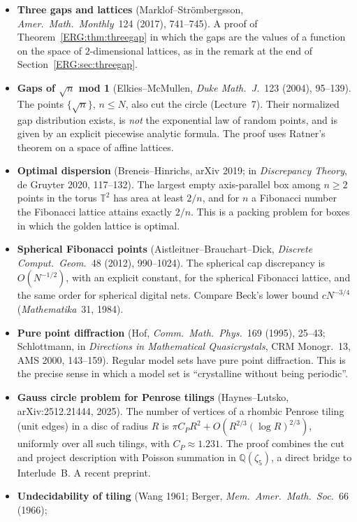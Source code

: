 \documentclass[11pt,openany]{book}
\theoremstyle{plain}
\theoremstyle{definition}
\theoremstyle{remark}
\newcommand{\Q}{\mathbb{Q}}
\newcommand{\T}{\mathbb{T}}
\begin{document}
\begin{itemize}[leftmargin=1.2em,itemsep=0.45em]
  Hausdorff dimension $0$. By the Dani correspondence, Littlewood concerns orbits of the $2$-parameter
  diagonal group on $X_3$.
\item \textbf{Three gaps and lattices} (Marklof--Str\"ombergsson, \emph{Amer.\ Math.\ Monthly}~124 (2017),
  741--745). A proof of Theorem~\ref{ERG:thm:threegap} in which the gaps are the values of a function on the
  space of $2$-dimensional lattices, as in the remark at the end of Section~\ref{ERG:sec:threegap}.
\item \textbf{Gaps of $\sqrt n$ mod 1} (Elkies--McMullen, \emph{Duke Math.\ J.}~123 (2004), 95--139). The
  points $\{\sqrt n\}$, $n\le N$, also cut the circle (Lecture~7). Their normalized gap distribution
  exists, is \emph{not} the exponential law of random points, and is given by an explicit piecewise analytic
  formula. The proof uses Ratner's theorem on a space of affine lattices.
\item \textbf{Optimal dispersion} (Breneis--Hinrichs, arXiv 2019; in \emph{Discrepancy Theory}, de Gruyter
  2020, 117--132). The largest empty axis-parallel box among $n\ge2$ points in the torus $\T^2$ has area at least $2/n$,
  and for $n$ a Fibonacci number the Fibonacci lattice attains exactly $2/n$. This is a packing problem
  for boxes in which the golden lattice is optimal.
\item \textbf{Spherical Fibonacci points} (Aistleitner--Brauchart--Dick, \emph{Discrete Comput.\ Geom.}~48
  (2012), 990--1024). The spherical cap discrepancy is $O(N^{-1/2})$, with an explicit constant, for the spherical
  Fibonacci lattice, and the same order for spherical digital nets. Compare Beck's lower bound $cN^{-3/4}$
  (\emph{Mathematika}~31, 1984).
\item \textbf{Pure point diffraction} (Hof, \emph{Comm.\ Math.\ Phys.}~169 (1995), 25--43; Schlottmann,
  in \emph{Directions in Mathematical Quasicrystals}, CRM Monogr.~13, AMS 2000, 143--159). Regular model
  sets have pure point diffraction. This is the precise sense in which a model set is ``crystalline
  without being periodic''.
\item \textbf{Gauss circle problem for Penrose tilings} (Haynes--Lutsko, arXiv:2512.21444, 2025). The number of
  vertices of a rhombic Penrose tiling (unit edges) in a disc of radius $R$ is
  $\pi C_PR^2+O(R^{2/3}(\log R)^{2/3})$, uniformly over all such tilings, with $C_P\approx1.231$. The proof
  combines the cut and project description with Poisson summation in $\Q(\zeta_5)$, a direct bridge to
  Interlude~B. A recent preprint.
\item \textbf{Undecidability of tiling} (Wang 1961; Berger, \emph{Mem.\ Amer.\ Math.\ Soc.}~66 (1966);

\end{itemize}
\end{document}

